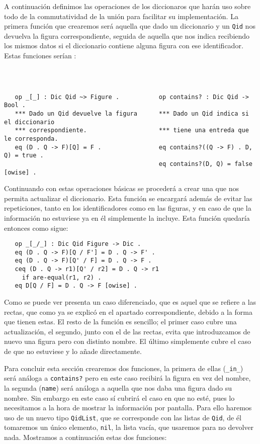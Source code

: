 A continuación definimos las operaciones de los diccionaros que harán uso sobre todo de la commutatividad de la unión para facilitar su implementación. La primera función que crearemos será aquella que dado un diccionario y un \texttt{Qid} nos devuelva la figura correspondiente, seguida de aquella que nos indica recibiendo los mismos datos si el diccionario contiene alguna figura con ese identificador. Estas funciones serían :
{\codesize
\begin{verbatim}



   op _[_] : Dic Qid ~> Figure .           op contains? : Dic Qid -> Bool .
   *** Dado un Qid devuelve la figura      *** Dado un Qid indica si el diccionario
   *** correspondiente.                    *** tiene una entreda que le corresponda.
   eq (D . Q -> F)[Q] = F .                eq contains?((Q -> F) . D, Q) = true .
                                           eq contains?(D, Q) = false [owise] .

\end{verbatim}
}

Continuando con estas operaciones básicas se procederá a crear una que nos permita actualizar el diccionario. Esta función se encargará además de evitar las repeticiones, tanto en los identificadores como en las figuras, y en caso de que la información no estuviese ya en él simplemente la incluye. Esta función quedaría entonces como sigue:

{\codesize
\begin{verbatim}
   op _[_/_] : Dic Qid Figure -> Dic .
   eq (D . Q -> F)[Q / F'] = D . Q -> F' .
   eq (D . Q -> F)[Q' / F] = D . Q -> F .
   ceq (D . Q -> r1)[Q' / r2] = D . Q -> r1
     if are-equal(r1, r2) .   
   eq D[Q / F] = D . Q -> F [owise] .
\end{verbatim}
}

Como se puede ver presenta un caso diferenciado, que es aquel que se refiere a las rectas, que como ya se explicó en el apartado correspondiente, debido a la forma que tienen  estas. El resto de la función es sencillo; el primer caso cubre una actualización, el segundo, junto con el de las rectas, evita que introduzcamos de nuevo una figura pero con distinto nombre. El último simplemente cubre el caso de que no estuviese y lo añade directamente.\par

Para concluir esta sección crearemos dos funciones, la primera de ellas (\verb"_in_") será análoga a \verb"contains?" pero en este caso recibirá la figura en vez del nombre, la segunda (\verb"name") será análoga a aquella que nos daba una figura dado su nombre. Sin embargo en este caso sí cubrirá el caso en que no esté, pues lo necesitamos a la hora de mostrar la información por pantalla. Para ello haremos uso de un nuevo tipo \verb"QidList", que se corresponde con las listas de \verb"Qid", de él tomaremos un único elemento, \verb"nil", la lista vacía, que usaremos para no devolver nada. Mostramos a continuación estas dos funciones:\par 

